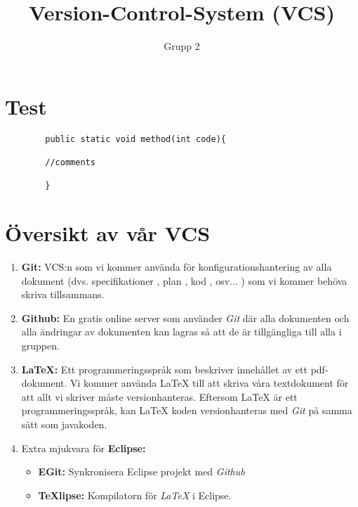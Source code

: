 \documentclass[11pt]{amsart}
\title{Version-Control-System (VCS)}
\author{Grupp 2}
\begin{document}
\maketitle
\lstset{language=Java}

\section{Test}
\begin{lstlisting}
		public static void method(int code){
		
		//comments

		}
\end{lstlisting}

\section*{\"{O}versikt av v\r{a}r VCS}

\begin{enumerate}

\item \textbf{Git:} VCS:n som vi kommer anv\"{a}nda f\"{o}r konfigurationshantering av alla dokument (dvs. specifikationer , plan , kod , osv... ) som vi kommer beh\"{o}va skriva tillsammans. \\

\item \textbf{Github:} En gratis online server som anv\"{a}nder \textit{Git} d\"{a}r alla dokumenten och alla \"{a}ndringar av dokumenten kan lagras s\r{a} att de \"{a}r tillg\"{a}ngliga till alla i gruppen. \\

\item \textbf{LaTeX:} Ett programmeringsspr\r{a}k som beskriver inneh\r{a}llet av ett pdf-dokument. Vi kommer anv\"{a}nda LaTeX till att skriva v\r{a}ra textdokument f\"{o}r att allt vi skriver m\r{a}ste versionhanteras. Eftersom LaTeX \"{a}r ett programmeringsspr\r{a}k, kan LaTeX koden versionhanteras med \textit{Git} p\r{a} samma s\"{a}tt som javakoden.\\

\item Extra mjukvara f\"{o}r \textbf{Eclipse:}  
	\begin{itemize}
	\item \textbf{EGit:} Synkronisera Eclipse projekt med \textit{Github}
	\item \textbf{TeXlipse:} Kompilatorn f\"{o}r \textit{LaTeX} i Eclipse. 
	\end{itemize}
	
\end{enumerate}
$$ $$
\end{document}
